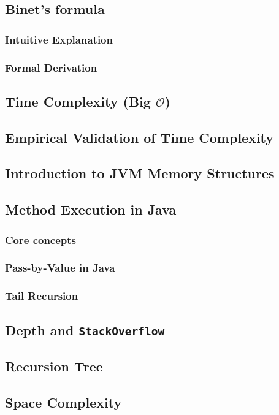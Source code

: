\documentclass{article}
\begin{document}
\subsection{Binet's formula}
\subsubsection{Intuitive Explanation}
\subsubsection{Formal Derivation}
\subsection{Time Complexity (Big $\mathcal{O}$)}
\subsection{Empirical Validation of Time Complexity}
\subsection{Introduction to JVM Memory Structures}
\subsection{Method Execution in Java}
\subsubsection{Core concepts}
\subsubsection{Pass-by-Value in Java}
\subsubsection{Tail Recursion}
\subsection{Depth and \lstinline[basicstyle=\ttfamily\small]{StackOverflow}}
\subsection{Recursion Tree}
\subsection{Space Complexity}
\end{document}
